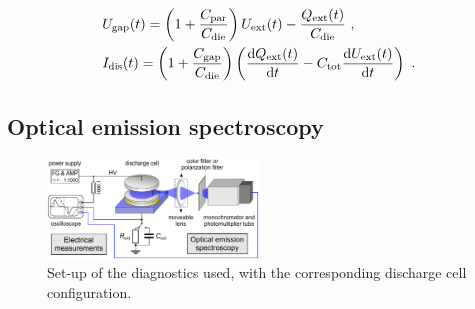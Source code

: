 \documentclass[a4paper,10pt,twoside]{article}
\newcommand{\diff}{\textnormal{d}}
\newcommand{\ix}[1]{_\text{#1}}
\begin{document}
				\begin{align*}
					 &U\ix{gap}(t)=\left(1+\frac{C\ix{par}}{C\ix{die}}\right)U\ix{ext}(t)-\frac{Q\ix{ext}(t)}{C\ix{die}} \,\, , \\
					 &I\ix{dis}(t)=\left(1+\frac{C\ix{gap}}{C\ix{die}}\right)\left(\frac{\diff Q\ix{ext}(t)}{\diff t}-C\ix{tot}\frac{\diff U\ix{ext}(t)}{\diff t}\right) \,\, .
				\end{align*}	

		\subsection{Optical emission spectroscopy}\label{subsec:oes}
		
				\begin{figure}
					\centering
					\includegraphics[width=0.5\textwidth]{figures/setup/setup}
					\caption{Set-up of the diagnostics used, with the corresponding discharge cell configuration.}
					\label{img:diag}
				\end{figure}
		
\end{document}
